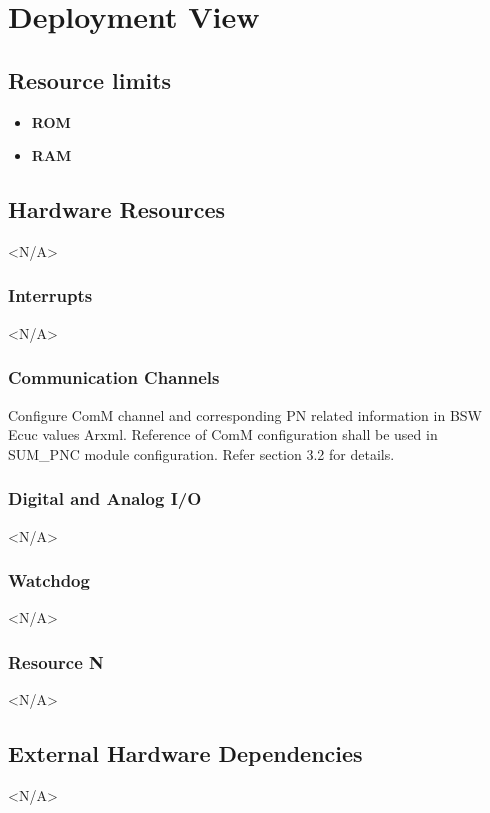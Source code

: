 \chapter{Deployment View}

\section{Resource limits}

\begin{itemize}
	\item \textbf{ROM}
	
	\item \textbf{RAM}
	
\end{itemize}

\section{Hardware Resources}
<N/A>

\subsection{Interrupts}
<N/A>

\subsection{Communication Channels}
Configure ComM channel and corresponding PN related information in BSW Ecuc values Arxml. Reference of ComM configuration shall be used in SUM_PNC module configuration. Refer section 3.2 for details.

\subsection{Digital and Analog I/O}
<N/A>

\subsection{Watchdog}
<N/A>

\subsection{Resource N}
<N/A>

\section{External Hardware Dependencies}
<N/A>
